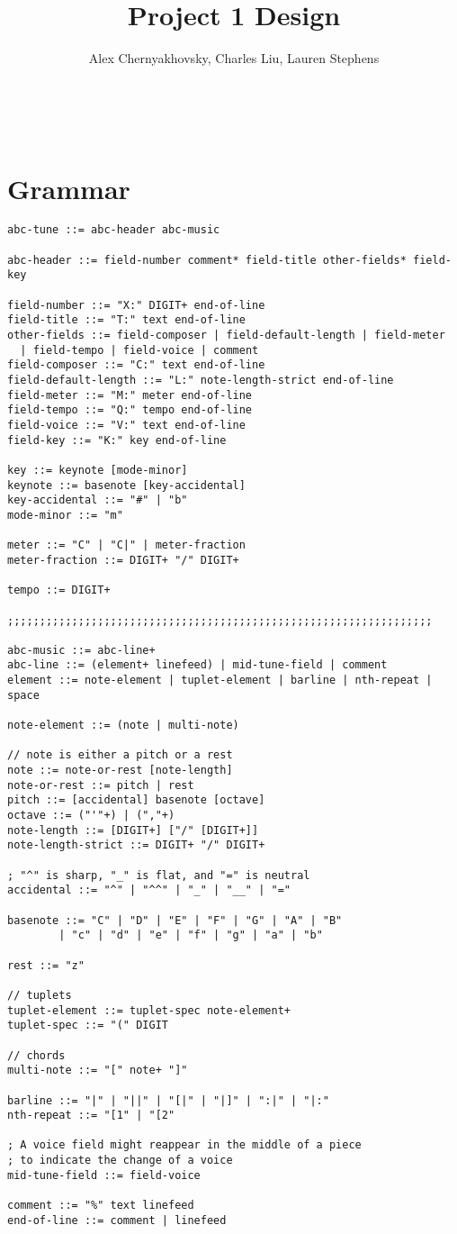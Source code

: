 \documentclass[12pt]{article}
\newcommand{\student}{Alex Chernyakhovsky, Charles Liu, Lauren Stephens}
\newcommand{\pset}{Project 1 Design}
\begin{document}
\title{\pset}
\author{\student}
\date{}
\maketitle
\thispagestyle{fancy}
\
\section{Grammar}
\begin{verbatim}
abc-tune ::= abc-header abc-music

abc-header ::= field-number comment* field-title other-fields* field-key
        
field-number ::= "X:" DIGIT+ end-of-line
field-title ::= "T:" text end-of-line
other-fields ::= field-composer | field-default-length | field-meter
  | field-tempo | field-voice | comment
field-composer ::= "C:" text end-of-line
field-default-length ::= "L:" note-length-strict end-of-line
field-meter ::= "M:" meter end-of-line
field-tempo ::= "Q:" tempo end-of-line
field-voice ::= "V:" text end-of-line
field-key ::= "K:" key end-of-line

key ::= keynote [mode-minor]
keynote ::= basenote [key-accidental]
key-accidental ::= "#" | "b"
mode-minor ::= "m"

meter ::= "C" | "C|" | meter-fraction
meter-fraction ::= DIGIT+ "/" DIGIT+

tempo ::= DIGIT+

;;;;;;;;;;;;;;;;;;;;;;;;;;;;;;;;;;;;;;;;;;;;;;;;;;;;;;;;;;;;;;;;;;

abc-music ::= abc-line+
abc-line ::= (element+ linefeed) | mid-tune-field | comment
element ::= note-element | tuplet-element | barline | nth-repeat | space

note-element ::= (note | multi-note)

// note is either a pitch or a rest
note ::= note-or-rest [note-length]
note-or-rest ::= pitch | rest
pitch ::= [accidental] basenote [octave]
octave ::= ("'"+) | (","+)
note-length ::= [DIGIT+] ["/" [DIGIT+]]
note-length-strict ::= DIGIT+ "/" DIGIT+

; "^" is sharp, "_" is flat, and "=" is neutral
accidental ::= "^" | "^^" | "_" | "__" | "="

basenote ::= "C" | "D" | "E" | "F" | "G" | "A" | "B"
        | "c" | "d" | "e" | "f" | "g" | "a" | "b"

rest ::= "z"

// tuplets
tuplet-element ::= tuplet-spec note-element+
tuplet-spec ::= "(" DIGIT

// chords
multi-note ::= "[" note+ "]"

barline ::= "|" | "||" | "[|" | "|]" | ":|" | "|:"
nth-repeat ::= "[1" | "[2"

; A voice field might reappear in the middle of a piece
; to indicate the change of a voice
mid-tune-field ::= field-voice

comment ::= "%" text linefeed
end-of-line ::= comment | linefeed
\end{verbatim}
\end{document}
